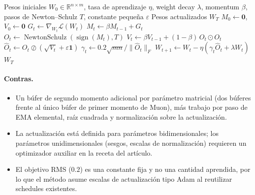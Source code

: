 \begin{algorithm}[H]
\caption{AdaMuon (Muon Adaptativo)}
\label{alg:ada-muon}
\begin{algorithmic}[1]
\Require Pesos iniciales $W_0 \in \mathbb{R}^{n \times m}$, tasa de aprendizaje $\eta$, weight decay $\lambda$, momentum $\beta$, pasos de Newton--Schulz $T$, constante pequeña $\varepsilon$
\Ensure Pesos actualizados $W_T$
\State $M_0 \gets \mathbf{0}$, $V_0 \gets \mathbf{0}$
    \State $G_t \gets \nabla_{W_t}\mathcal{L}(W_t)$
    \State $M_t \gets \beta M_{t-1} + G_t$
    \State $O_t \gets \operatorname{NewtonSchulz}(\operatorname{sign}(M_t), T)$
    \State $V_t \gets \beta V_{t-1} + (1-\beta)\, O_t \odot O_t$
    \State $\widehat{O}_t \gets O_t \oslash (\sqrt{V_t} + \varepsilon\mathbf{1})$
    \State $\gamma_t \gets 0.2\sqrt{mn}/\|\widehat{O}_t\|_F$
    \State $W_{t+1} \gets W_t - \eta(\gamma_t \widehat{O}_t + \lambda W_t)$
\EndFor
\Return $W_T$
\end{algorithmic}
\end{algorithm}

\paragraph{Contras.}
\begin{itemize}[leftmargin=*]
\item Un búfer de segundo momento adicional por parámetro matricial (dos búferes frente al único búfer de primer momento de Muon), más trabajo por paso de EMA elemental, raíz cuadrada y normalización sobre la actualización.
\item La actualización está definida para parámetros bidimensionales; los parámetros unidimensionales (sesgos, escalas de normalización) requieren un optimizador auxiliar en la receta del artículo.
\item El objetivo RMS ($0.2$) es una constante fija y no una cantidad aprendida, por lo que el método asume escalas de actualización tipo Adam al reutilizar schedules existentes.
\end{itemize}

